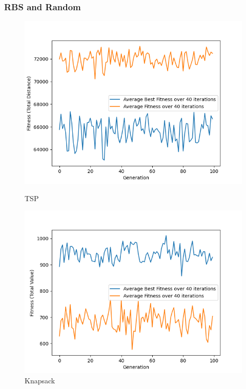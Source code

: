 \documentclass[11pt, letterpaper]{article}
\begin{document}
\subsubsection {RBS and Random}
\begin{figure}[H]
  \includegraphics[width=\linewidth]{images/tsp_rb_rd.png}
  \caption{TSP}
\endminipage\hfill
{}
  \includegraphics[width=\linewidth]{images/knapsack_rb_rd.png}
  \caption{Knapsack}
\endminipage\hfill
{}%

\end{figure}
\end{document}
